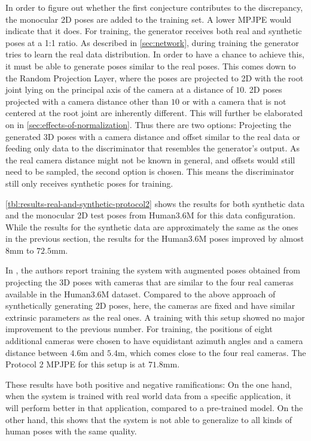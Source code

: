 In order to figure out whether the first conjecture contributes to the discrepancy, the monocular 2D poses are added to the training set.
A lower MPJPE would indicate that it does.
For training, the generator receives both real and synthetic poses at a 1:1 ratio.
As described in \autoref{sec:network}, during training the generator tries to learn the real data distribution.
In order to have a chance to achieve this, it must be able to generate poses similar to the real poses. 
This comes down to the Random Projection Layer, where the poses are projected to 2D with the root joint lying on the principal axis of the camera at a distance of $10$.
2D poses projected with a camera distance other than $10$ or with a camera that is not centered at the root joint are inherently different.
This will further be elaborated on in \autoref{sec:effects-of-normalization}.
Thus there are two options:
Projecting the generated 3D poses with a camera distance and offset similar to the real data or feeding only data to the discriminator that resembles the generator's output.
As the real camera distance might not be known in general, and offsets would still need to be sampled, the second option is chosen.
This means the discriminator still only receives synthetic poses for training.



\autoref{tbl:results-real-and-synthetic-protocol2} shows the results for both synthetic data and the monocular 2D test poses from Human3.6M for this data configuration.
While the results for the synthetic data are approximately the same as the ones in the previous section, the results for the Human3.6M poses improved by almost $8$mm to $72.5$mm.

In \cite{drover18}, the authors report training the system with augmented poses obtained from projecting the 3D poses with cameras that are similar to the four real cameras available in the Human3.6M dataset.
Compared to the above approach of synthetically generating 2D poses, here, the cameras are fixed and have similar extrinsic parameters as the real ones.
A training with this setup showed no major improvement to the previous number.
For training, the positions of eight additional cameras were chosen to have equidistant azimuth angles and a camera distance between $4.6$m and $5.4$m, which comes close to the four real cameras.
The Protocol 2 MPJPE for this setup is at $71.8$mm.

These results have both positive and negative ramifications:
On the one hand, when the system is trained with real world data from a specific application, it will perform better in that application, compared to a pre-trained model.
On the other hand, this shows that the system is not able to generalize to all kinds of human poses with the same quality. 
